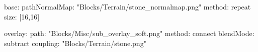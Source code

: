 base:
  pathNormalMap: "Blocks/Terrain/stone_normalmap.png"
  method: repeat
  size: [16,16]

overlay:
  path: "Blocks/Misc/sub_overlay_soft.png"
  method: connect
  blendMode: subtract
  coupling: "Blocks/Terrain/stone.png"